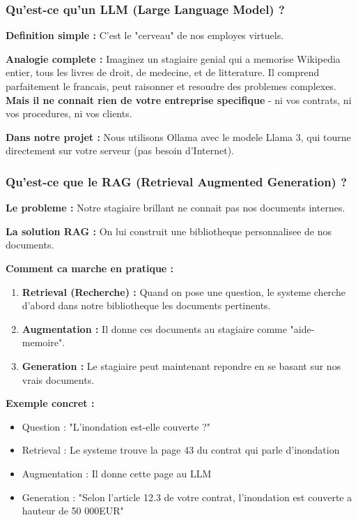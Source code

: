 \documentclass[a4paper,12pt]{article}
\begin{document}
\subsubsection{Qu'est-ce qu'un LLM (Large Language Model) ?}
\textbf{Definition simple :} C'est le "cerveau" de nos employes virtuels.

\textbf{Analogie complete :} Imaginez un stagiaire genial qui a memorise Wikipedia entier, tous les livres de droit, de medecine, et de litterature. Il comprend parfaitement le francais, peut raisonner et resoudre des problemes complexes. \textbf{Mais il ne connait rien de votre entreprise specifique} - ni vos contrats, ni vos procedures, ni vos clients.

\textbf{Dans notre projet :} Nous utilisons Ollama avec le modele Llama 3, qui tourne directement sur votre serveur (pas besoin d'Internet).

\subsubsection{Qu'est-ce que le RAG (Retrieval Augmented Generation) ?}
\textbf{Le probleme :} Notre stagiaire brillant ne connait pas nos documents internes.

\textbf{La solution RAG :} On lui construit une bibliotheque personnalisee de nos documents.

\textbf{Comment ca marche en pratique :}
\begin{enumerate}
    \item \textbf{Retrieval (Recherche) :} Quand on pose une question, le systeme cherche d'abord dans notre bibliotheque les documents pertinents.
    \item \textbf{Augmentation :} Il donne ces documents au stagiaire comme "aide-memoire".
    \item \textbf{Generation :} Le stagiaire peut maintenant repondre en se basant sur nos vrais documents.
\end{enumerate}

\textbf{Exemple concret :}
\begin{itemize}
    \item Question : "L'inondation est-elle couverte ?"
    \item Retrieval : Le systeme trouve la page 43 du contrat qui parle d'inondation
    \item Augmentation : Il donne cette page au LLM
    \item Generation : "Selon l'article 12.3 de votre contrat, l'inondation est couverte a hauteur de 50 000EUR"
\end{itemize}
\end{document}
